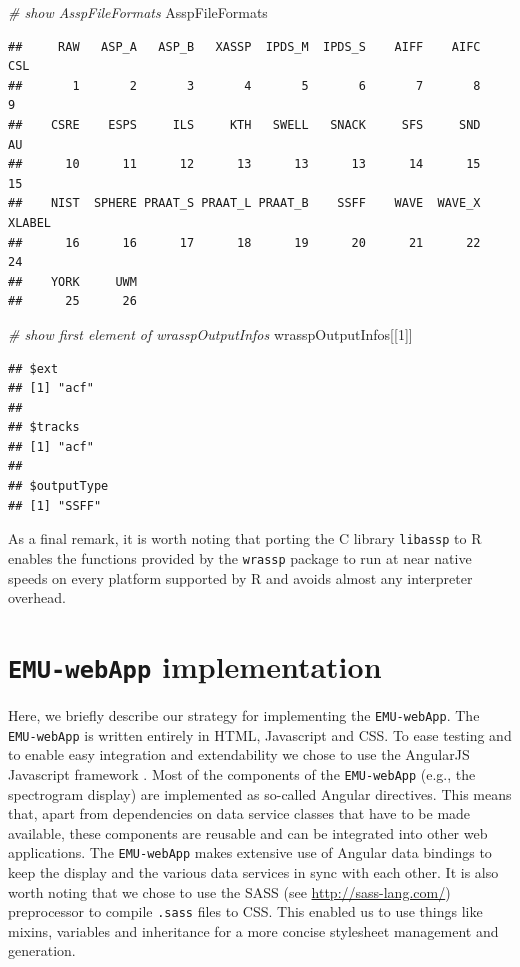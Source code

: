 \documentclass[]{book}
\newenvironment{Shaded}{\begin{snugshade}}{\end{snugshade}}
\newcommand{\CommentTok}[1]{\textcolor[rgb]{0.56,0.35,0.01}{\textit{#1}}}
\newcommand{\DecValTok}[1]{\textcolor[rgb]{0.00,0.00,0.81}{#1}}
\newcommand{\NormalTok}[1]{#1}
\theoremstyle{definition}
\theoremstyle{definition}
\theoremstyle{definition}
\theoremstyle{remark}
\begin{document}
\begin{Shaded}
\begin{Highlighting}[]
\CommentTok{# show AsspFileFormats}
\NormalTok{AsspFileFormats}
\end{Highlighting}
\end{Shaded}

\begin{verbatim}
##     RAW   ASP_A   ASP_B   XASSP  IPDS_M  IPDS_S    AIFF    AIFC     CSL 
##       1       2       3       4       5       6       7       8       9 
##    CSRE    ESPS     ILS     KTH   SWELL   SNACK     SFS     SND      AU 
##      10      11      12      13      13      13      14      15      15 
##    NIST  SPHERE PRAAT_S PRAAT_L PRAAT_B    SSFF    WAVE  WAVE_X  XLABEL 
##      16      16      17      18      19      20      21      22      24 
##    YORK     UWM 
##      25      26
\end{verbatim}

\begin{Shaded}
\begin{Highlighting}[]
\CommentTok{# show first element of wrasspOutputInfos}
\NormalTok{wrasspOutputInfos[[}\DecValTok{1}\NormalTok{]]}
\end{Highlighting}
\end{Shaded}

\begin{verbatim}
## $ext
## [1] "acf"
## 
## $tracks
## [1] "acf"
## 
## $outputType
## [1] "SSFF"
\end{verbatim}

As a final remark, it is worth noting that porting the C library
\texttt{libassp} to R enables the functions provided by the
\texttt{wrassp} package to run at near native speeds on every platform
supported by R and avoids almost any interpreter overhead.

\hypertarget{chap:emu-webAppImplementation}{%
\chapter{\texorpdfstring{\texttt{EMU-webApp}
implementation}{EMU-webApp implementation}}\label{chap:emu-webAppImplementation}}

Here, we briefly describe our strategy for implementing the
\texttt{EMU-webApp}. The \texttt{EMU-webApp} is written entirely in
HTML, Javascript and CSS. To ease testing and to enable easy integration
and extendability we chose to use the AngularJS Javascript framework
\citep{google:2014a}. Most of the components of the \texttt{EMU-webApp}
(e.g., the spectrogram display) are implemented as so-called Angular
directives. This means that, apart from dependencies on data service
classes that have to be made available, these components are reusable
and can be integrated into other web applications. The
\texttt{EMU-webApp} makes extensive use of Angular data bindings to keep
the display and the various data services in sync with each other. It is
also worth noting that we chose to use the SASS (see
\url{http://sass-lang.com/}) preprocessor to compile \texttt{.sass}
files to CSS. This enabled us to use things like mixins, variables and
inheritance for a more concise stylesheet management and generation.
\end{document}
